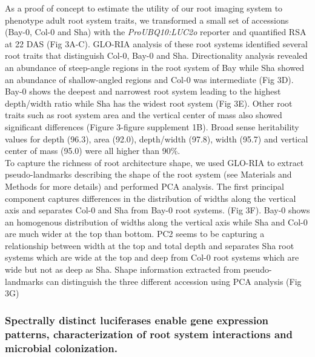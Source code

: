 \documentclass[]{article}
\begin{document}
As a proof of concept to estimate the utility of our root imaging system
to phenotype adult root system traits, we transformed a small set of
accessions (Bay-0, Col-0 and Sha) with the \emph{ProUBQ10:LUC2o}
reporter and quantified RSA at 22 DAS (Fig 3A-C). GLO-RIA analysis of
these root systems identified several root traits that distinguish
Col-0, Bay-0 and Sha. Directionality analysis revealed an abundance of
steep-angle regions in the root system of Bay while Sha showed an
abundance of shallow-angled regions and Col-0 was intermediate (Fig 3D).
Bay-0 shows the deepest and narrowest root system leading to the highest
depth/width ratio while Sha has the widest root system (Fig 3E). Other
root traits such as root system area and the vertical center of mass
also showed significant differences (Figure 3-figure supplement 1B).
Broad sense heritability values for depth (96.3), area (92.0),
depth/width (97.8), width (95.7) and vertical center of mass (95.0) were
all higher than 90\%.\\ To capture the richness of root architecture
shape, we used GLO-RIA to extract pseudo-landmarks describing the shape
of the root system (see Materials and Methods for more details) and
performed PCA analysis. The first principal component captures
differences in the distribution of widths along the vertical axis and
separates Col-0 and Sha from Bay-0 root systems. (Fig 3F). Bay-0 shows
an homogenous distribution of widths along the vertical axis while Sha
and Col-0 are much wider at the top than bottom. PC2 seems to be
capturing a relationship between width at the top and total depth and
separates Sha root systems which are wide at the top and deep from Col-0
root systems which are wide but not as deep as Sha. Shape information
extracted from pseudo-landmarks can distinguish the three different
accession using PCA analysis (Fig 3G)

\subsubsection{Spectrally distinct luciferases enable gene expression
patterns, characterization of root system interactions and microbial
colonization.}\label{spectrally-distinct-luciferases-enable-gene-expression-patterns-characterization-of-root-system-interactions-and-microbial-colonization.}
\end{document}
